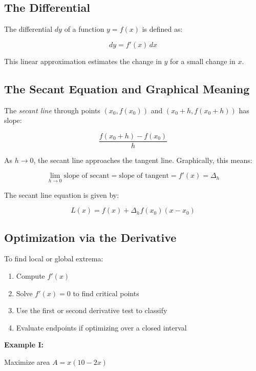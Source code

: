 \subsection{The Differential}

The differential \(dy\) of a function \(y = f(x)\) is defined as:

\[
    dy = f'(x) \, dx
\]

This linear approximation estimates the change in \(y\) for a small change in \(x\).

\subsection{The Secant Equation and Graphical Meaning}

The \emph{secant line} through points \((x_0, f(x_0))\) and \((x_0 + h, f(x_0 + h))\) has slope:

\[
    \frac{f(x_0 + h) - f(x_0)}{h}
\]

As \(h \to 0\), the secant line approaches the tangent line. Graphically, this means:

\[
    \lim_{h \to 0} \text{slope of secant} = \text{slope of tangent} = f'(x) = \Delta_h
\]

The secant line equation is given by:

\[
    L(x) = f(x) + \Delta_h f(x_0)(x - x_0)
\]

\subsection{Optimization via the Derivative}

To find local or global extrema:

\begin{enumerate}

    \item Compute \(f'(x)\)

    \item Solve \(f'(x) = 0\) to find critical points

    \item Use the first or second derivative test to classify

    \item Evaluate endpoints if optimizing over a closed interval

\end{enumerate}

\textbf{Example I:}

Maximize area \(A = x(10 - 2x)\)

